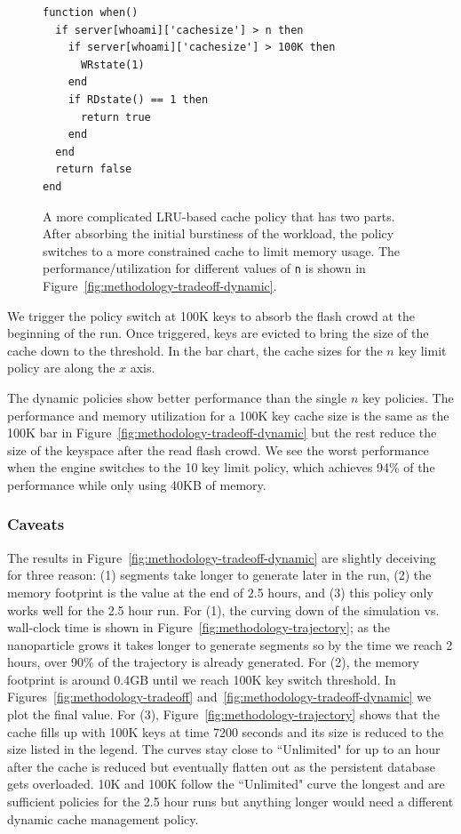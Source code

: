 \begin{figure}[t]
\footnotesize
\centering
\begin{verbatim}
function when()
  if server[whoami]['cachesize'] > n then
    if server[whoami]['cachesize'] > 100K then
      WRstate(1)
    end
    if RDstate() == 1 then
      return true
    end
  end
  return false
end
\end{verbatim}
\caption{A more complicated LRU-based cache policy that has two parts. After
absorbing the initial burstiness of the workload, the policy switches to a more
constrained cache to limit memory usage. The performance/utilization for
different values of \texttt{n} is shown in
Figure~\ref{fig:methodology-tradeoff-dynamic}. \label{src:lru-dyn}}
\end{figure}

We trigger the policy switch at 100K keys to absorb the flash crowd at the
beginning of the run. Once triggered, keys are evicted to bring the size of the
cache down to the threshold.  In the bar chart, the cache sizes for the \(n\)
key limit policy are along the \(x\) axis.

The dynamic policies show better performance than the single \(n\) key
policies. The performance and memory utilization for a 100K key cache size is
the same as the 100K bar in Figure~\ref{fig:methodology-tradeoff-dynamic} but
the rest reduce the size of the keyspace after the read flash crowd.  We see
the worst performance when the engine switches to the 10 key limit policy,
which achieves 94\% of the performance while only using 40KB of memory. 

\subsubsection*{Caveats}

The results in Figure~\ref{fig:methodology-tradeoff-dynamic} are slightly
deceiving for three reason: (1) segments take longer to generate later in the
run, (2) the memory footprint is the value at the end of 2.5 hours, and (3)
this policy only works well for the 2.5 hour run.  For (1), the curving down of
the simulation vs. wall-clock time is shown in
Figure~\ref{fig:methodology-trajectory}; as the nanoparticle grows it takes
longer to generate segments so by the time we reach 2 hours, over 90\% of the
trajectory is already generated.  For (2), the memory footprint is around 0.4GB
until we reach 100K key switch threshold. In
Figures~\ref{fig:methodology-tradeoff}
and~\ref{fig:methodology-tradeoff-dynamic} we plot the final value. For (3),
Figure~\ref{fig:methodology-trajectory} shows that the cache fills up with 100K
keys at time 7200 seconds and its size is reduced to the size listed in the
legend.  The curves stay close to ``Unlimited" for up to an hour after the
cache is reduced but eventually flatten out as the persistent database gets
overloaded. 10K and 100K follow the ``Unlimited" curve the longest and are
sufficient policies for the 2.5 hour runs but anything longer would need a
different dynamic cache management policy.

